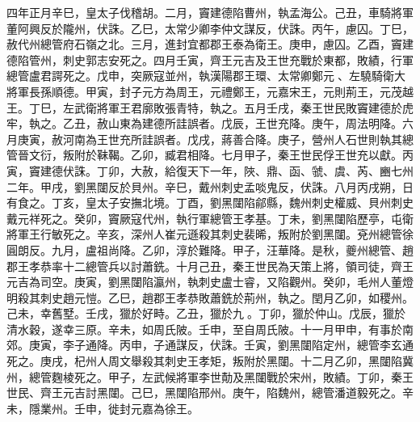 \begin{pinyinscope}
 四年正月辛巳，皇太子伐稽胡。二月，竇建德陷曹州，執孟海公。己丑，車騎將軍董阿興反於隴州，伏誅。乙巳，太常少卿李仲文謀反，伏誅。丙午，慮囚。丁巳，赦代州總管府石嶺之北。三月，進封宜都郡王泰為衛王。庚申，慮囚。乙酉，竇建德陷管州，刺史郭志安死之。四月壬寅，齊王元吉及王世充戰於東都，敗績，行軍總管盧君諤死之。戊申，突厥寇並州，執漢陽郡王環、太常卿鄭元、左驍騎衛大將軍長孫順德。甲寅，封子元方為周王，元禮鄭王，元嘉宋王，元則荊王，元茂越王。丁巳，左武衛將軍王君廓敗張青特，執之。五月壬戌，秦王世民敗竇建德於虎牢，執之。乙丑，赦山東為建德所詿誤者。戊辰，王世充降。庚午，周法明降。六月庚寅，赦河南為王世充所詿誤者。戊戌，蔣善合降。庚子，營州人石世則執其總管晉文衍，叛附於靺鞨。乙卯，臧君相降。七月甲子，秦王世民俘王世充以獻。丙寅，竇建德伏誅。丁卯，大赦，給復天下一年，陜、鼎、函、虢、虞、芮、豳七州二年。甲戌，劉黑闥反於貝州。辛巳，戴州刺史孟啖鬼反，伏誅。八月丙戌朔，日有食之。丁亥，皇太子安撫北境。丁酉，劉黑闥陷鄃縣，魏州刺史權威、貝州刺史戴元祥死之。癸卯，竇厥寇代州，執行軍總管王孝基。丁未，劉黑闥陷歷亭，屯衛將軍王行敏死之。辛亥，深州人崔元遜殺其刺史裴晞，叛附於劉黑闥。兗州總管徐圓朗反。九月，盧祖尚降。乙卯，淳於難降。甲子，汪華降。是秋，夔州總管、趙郡王孝恭率十二總管兵以討蕭銑。十月己丑，秦王世民為天策上將，領司徒，齊王元吉為司空。庚寅，劉黑闥陷瀛州，執刺史盧士睿，又陷觀州。癸卯，毛州人董燈明殺其刺史趙元愷。乙巳，趙郡王孝恭敗蕭銑於荊州，執之。閏月乙卯，如稷州。己未，幸舊墅。壬戌，獵於好畤。乙丑，獵於九。丁卯，獵於仲山。戊辰，獵於清水穀，遂幸三原。辛未，如周氏陂。壬申，至自周氏陂。十一月甲申，有事於南郊。庚寅，李子通降。丙申，子通謀反，伏誅。壬寅，劉黑闥陷定州，總管李玄通死之。庚戌，杞州人周文舉殺其刺史王孝矩，叛附於黑闥。十二月乙卯，黑闥陷冀州，總管麴棱死之。甲子，左武候將軍李世勣及黑闥戰於宋州，敗績。丁卯，秦王世民、齊王元吉討黑闥。己巳，黑闥陷邢州。庚午，陷魏州，總管潘道毅死之。辛未，隱業州。壬申，徙封元嘉為徐王。




\end{pinyinscope}
